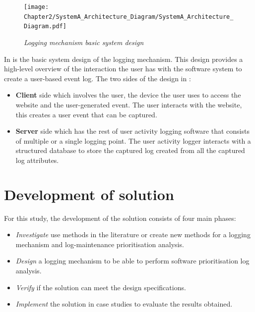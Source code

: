  \clearpage

 \begin{figure}[!htb]
	 \centering %
	 \texttt{[image: Chapter2/SystemA\_Architecture\_Diagram/SystemA\_Architecture\_Diagram.pdf]}
	 \caption[Logging mechanism basic system design]
	 {\textit{Logging mechanism basic system design}}\label{fig:ch2_systemDesign}
 \end{figure}
 
 In  is the basic system design of the logging mechanism. This design provides a high-level overview of the interaction the user has with the software system to create a user-based event log. The two sides of the design in :
 
 \begin{itemize}
	 \item \textbf{Client} side which involves the user, the device the user uses to access the website and the user-generated event. The user interacts with the website, this creates a user event that can be captured. 
	 \item \textbf{Server} side which has the rest of user activity logging software that consists of multiple or a single logging point. The user activity logger interacts with a structured database to store the captured log created from all the captured log attributes.
 \end{itemize}

 \clearpage

\section{Development of solution}\label{sec:ch2_developementOfSolution}
For this study, the development of the solution consists of four main phases:

\begin{itemize}
	\item \textit{Investigate} use methods in the literature or create new methods for a logging mechanism and log-maintenance prioritisation analysis.
	\item \textit{Design} a logging mechanism to be able to perform software prioritisation log analysis.
	\item \textit{Verify} if the solution can meet the design specifications.
	\item \textit{Implement} the solution in case studies to evaluate the results obtained.
\end{itemize}

